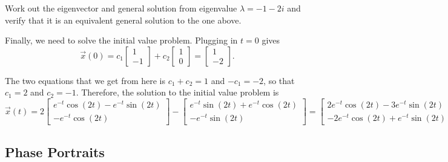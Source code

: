 \documentclass{ximera}
\begin{document}
\begin{exampleSol}
    \begin{exercise}
    Work out the eigenvector and general solution from eigenvalue $\lambda = -1 - 2i$ and verify that it is an equivalent general solution to the one above.
    \end{exercise}
    
    Finally, we need to solve the initial value problem. Plugging in $t=0$ gives 
    \begin{equation*}
        \vec{x}(0) = c_1 
        \begin{bmatrix} 
            1 \\ 
            -1 
        \end{bmatrix} 
        + c_2 
        \begin{bmatrix} 
            1 \\ 
            0 
        \end{bmatrix} = 
        \begin{bmatrix} 
            1 \\ 
            -2 
        \end{bmatrix}.
    \end{equation*}
    
    The two equations that we get from here is $c_1 + c_2 = 1$ and $-c_1 = -2$, so that $c_1 = 2$ and $c_2 = -1$. Therefore, the solution to the initial value problem is
    \begin{equation*}
        \vec{x}(t) = 2
        \begin{bmatrix} 
            e^{-t}\cos(2t) - e^{-t}\sin(2t) \\ 
            -e^{-t}\cos(2t)
        \end{bmatrix} - 
        \begin{bmatrix} 
            e^{-t}\sin(2t) + e^{-t}\cos(2t) \\ 
            -e^{-t}\sin(2t) 
        \end{bmatrix} = 
        \begin{bmatrix} 
            2e^{-t}\cos(2t) - 3e^{-t}\sin(2t) \\ 
            -2e^{-t}\cos(2t) + e^{-t}\sin(2t) 
        \end{bmatrix}.
    \end{equation*}
\end{exampleSol}

\subsection{Phase Portraits}
\end{document}
